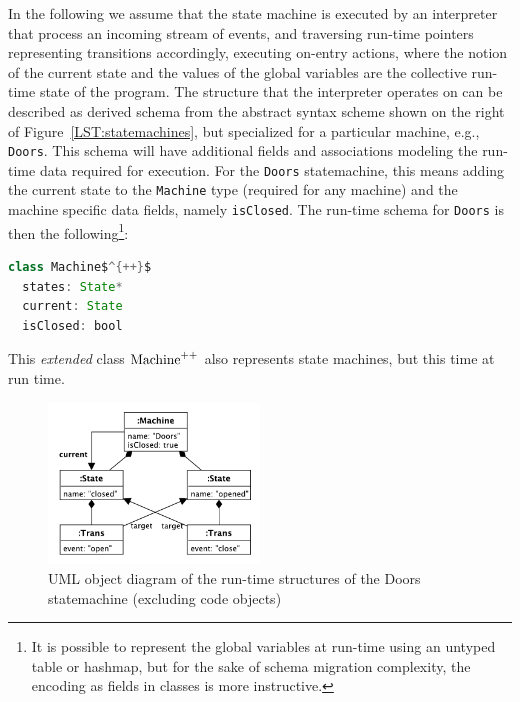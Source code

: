\documentclass[english,submission]{programming}
\begin{document}

In the following we assume that the state machine is executed by an interpreter that process an incoming stream of events, and traversing run-time pointers representing transitions accordingly, executing on-entry actions, where the notion of the current state and the values of the global variables are the collective run-time state of the program. The structure that the interpreter operates on can be described as derived  schema from the abstract syntax scheme shown on the right of Figure~\ref{LST:statemachines}, but specialized for a particular machine, e.g., \lstinline{Doors}.
This schema will have additional fields and associations modeling the run-time data required for execution. For the \lstinline{Doors} statemachine, this means adding the current state to the \lstinline{Machine} type (required for any machine) and the machine specific data fields, namely \lstinline{isClosed}. The run-time schema for \lstinline{Doors} is then the following\footnote{It is possible to represent the global variables at run-time using an untyped table or hashmap, but for the sake of schema migration complexity, the encoding as fields in classes is more instructive.}:

\begin{lstlisting}[language=java,morekeywords={on},mathescape=true]
class Machine$^{++}$
  states: State*
  current: State
  isClosed: bool
\end{lstlisting}

This \textit{extended} class $\text{\lstinline{Machine}}^{++}$ also represents state machines, but this time at run time.



\begin{figure}[t]
  \centering
\includegraphics[width=0.5\textwidth]{figures/doorsmachine.pdf}
\caption{UML object diagram of the run-time structures of the Doors statemachine (excluding code objects)}
\label{FIG:doorsRuntime}
\end{figure}
\end{document}
